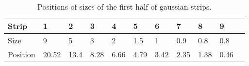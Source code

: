 \begin{table}[!ht]
  \centering
  \caption[Positions of sizes of the first half of gaussian strips]{Positions of sizes of the first half of gaussian strips.}
  \label{chap4:GaussianStrips}
  \begin{tabular}{lllllllllll}
    \toprule
    Strip    & 1     & 2    & 3    & 4    & 5    & 6    & 7    & 8    & 9    \\
    \midrule
    Size     & 9     & 5    & 3    & 2    & 1.5  & 1    & 0.9  & 0.8  & 0.8  \\
    Position & 20.52 & 13.4 & 8.28 & 6.66 & 4.79 & 3.42 & 2.35 & 1.38 & 0.46 \\
    \bottomrule
  \end{tabular}
\end{table}
